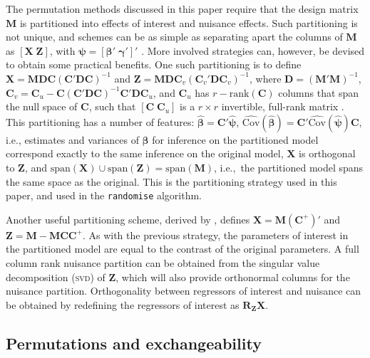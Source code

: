 The permutation methods discussed in this paper require that the design matrix $\mathbf{M}$ is partitioned into effects of interest and nuisance effects. Such partitioning is not unique, and schemes can be as simple as separating apart the columns of $\mathbf{M}$ as $\left[ \mathbf{X} \; \mathbf{Z} \right]$, with $\boldsymbol{\psi} = \left[ \boldsymbol{\beta}' \; \boldsymbol{\gamma}' \right]'$ \citep{Guttman1982}. More involved strategies can, however, be devised to obtain some practical benefits. One such partitioning is to define $\mathbf{X} = \mathbf{M} \mathbf{D} \mathbf{C} \left(\mathbf{C}'\mathbf{D}\mathbf{C}\right)^{-1}$ and 
$\mathbf{Z} = \mathbf{M} \mathbf{D} \mathbf{C}_v \left(\mathbf{C}_v'\mathbf{D}\mathbf{C}_v\right)^{-1}$, where $\mathbf{D}=(\mathbf{M}'\mathbf{M})^{-1}$, $\mathbf{C}_v=\mathbf{C}_u-\mathbf{C}(\mathbf{C}'\mathbf{D}\mathbf{C})^{-1}\mathbf{C}'\mathbf{D}\mathbf{C}_u$, and $\mathbf{C}_u$ has $r-\mathrm{rank}\left(\mathbf{C}\right)$ columns that span the null space of $\mathbf{C}$, such that $[\mathbf{C} \; \mathbf{C}_u]$ is a $r \times r$ invertible, full-rank matrix \citep{Beckmann2001, Smith2007}. This partitioning has a number of features: $\boldsymbol{\hat{\beta}} = \mathbf{C}'\boldsymbol{\hat{\psi}}$, $\widehat{\mathrm{Cov}}(\boldsymbol{\hat{\beta}}) = \mathbf{C}'\widehat{\mathrm{Cov}}(\boldsymbol{\hat{\psi}})\mathbf{C}$, i.e., estimates and variances of $\boldsymbol{\beta}$ for inference on the partitioned model correspond exactly to the same inference on the original model, $\mathbf{X}$ is orthogonal to $\mathbf{Z}$, and $\mathrm{span}(\mathbf{X}) \cup \mathrm{span}(\mathbf{Z}) = \mathrm{span}(\mathbf{M})$, i.e.,\ the partitioned model spans the same space as the original. This is the partitioning strategy used in this paper, and used in the \texttt{randomise} algorithm.

Another useful partitioning scheme, derived by \citet{Ridgway2009}, defines $\mathbf{X}=\mathbf{M}(\mathbf{C}^+)'$ and $\mathbf{Z}=\mathbf{M}-\mathbf{M}\mathbf{C}\mathbf{C}^{+}$. As with the previous strategy, the parameters of interest in the partitioned model are equal to the contrast of the original parameters. A full column rank nuisance partition can be obtained from the singular value decomposition (\textsc{svd}) of $\mathbf{Z}$, which will also provide orthonormal columns for the nuisance partition. Orthogonality between regressors of interest and nuisance can be obtained by redefining the regressors of interest as  $\mathbf{R}_{\mathbf{Z}}\mathbf{X}$.

\subsection{Permutations and exchangeability}

